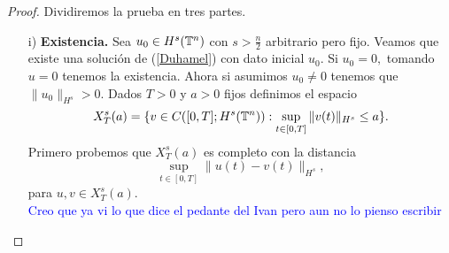 \begin{proof}
Dividiremos la prueba en tres partes.
\begin{itemize}
       \item[i)]\textbf{Existencia.} Sea $u_0\in H^s(\mathbb{T}^n)$ con $s>\frac{n}{2}$ arbitrario pero fijo. Veamos que existe una solución de (\ref{Duhamel}) con dato inicial $u_0.$ Si $u_0=0,$ tomando $u=0$ tenemos la existencia. Ahora si asumimos $u_0\neq 0$ tenemos que $\|u_0\|_{H^s}>0.$ Dados $T>0$ y $a>0$ fijos definimos el espacio
       $$X_T^s(a)=\{v\in C([0,T];H^s(\mathbb{T}^n)):\sup_{t\in[0,T]}\|v(t)\|_{H^s}\leq a\}.$$
       Primero probemos que $X_T^s(a)$ es completo con la distancia
       $$\sup_{t\in[0,T]}\|u(t)-v(t)\|_{H^s},$$
       para $u,v\in X^s_T(a)$.\\

       \textcolor{blue}{Creo que ya vi lo que dice el pedante del Ivan pero aun no lo pienso escribir}
       \\


\end{itemize}
\end{proof}
